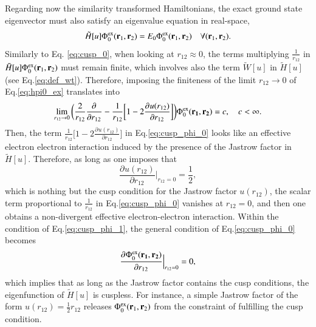 \documentclass[aip,jcp,reprint,noshowkeys,superscriptaddress]{revtex4-1}
\newcommand{\deriv}[3]{\frac{\partial^{#3} #1}{\partial {#2}^{#3}}}
\newcommand{\bd}[1]{{\bf {#1}}}
\newcommand{\br}[0]{{\bf {r}}}
\newcommand{\phiex}[0]{\Phi^{\text{ex}}_0}
\begin{document}
Regarding now the similarity transformed Hamiltonians, the exact ground state eigenvector must also satisfy an eigenvalue equation in real-space,
\begin{equation}
 \label{eq:hpi0_ex}
 \tilde{H}[u] \phiex(\br{}_1,\br{}_2) = E_0 \phiex(\br{}_1,\br{}_2) \quad \forall (\br{}_1,\br{}_2).
\end{equation}
Similarly to Eq. \eqref{eq:cusp_0}, when looking at $r_{12}\approx 0$, the terms multiplying $\frac{1}{r_{12}}$ in $\tilde{H}[u]\phiex(\br{}_1,\br{}_2)$ must remain finite, 
which involves also the term $\tilde{W}[u]$ in $\tilde{H}[u]$ (see Eq.\eqref{eq:def_wt}). Therefore, imposing the finiteness of the limit $r_{12}\rightarrow 0$ of Eq.\eqref{eq:hpi0_ex} translates into
\begin{equation}
 \label{eq:cusp_phi_0}
 \lim_{r_{12}\rightarrow 0}\bigg( \frac{2}{r_{12}} \deriv{}{r_{12}}{} -\frac{1}{r_{12}}\bigg[ 1 - 2 \deriv{u(r_{12})}{r_{12}}{}\bigg]\bigg) \phiex(\bd{r_1},\bd{r_2})  = c,\quad c<\infty.
\end{equation}
Then, the term $\frac{1}{r_{12}}\bigg[ 1 - 2\deriv{u(r_{12})}{r_{12}}{}\bigg]$ in Eq.\eqref{eq:cusp_phi_0} looks like an effective electron electron interaction induced by the presence of the Jastrow factor in $\tilde{H}[u]$. 
Therefore, as long as one imposes that 
\begin{equation}
 \label{eq:cusp_phi_1}
  \deriv{u(r_{12})}{r_{12}}{}\bigg|_{r_{12}=0} = \frac{1}{2},
\end{equation}
which is nothing but the cusp condition for the Jastrow factor $u(r_{12})$, the scalar term proportional to $\frac{1}{r_{12}}$ in Eq.\eqref{eq:cusp_phi_0} vanishes at $r_{12}=0$, and then one obtains a non-divergent effective electron-electron interaction. 
Within the condition of Eq.\eqref{eq:cusp_phi_1}, the general condition of Eq.\eqref{eq:cusp_phi_0} becomes 
\begin{equation}
 \label{eq:cusp_phi_2}
 \deriv{\phiex(\bd{r_1},\bd{r_2})}{r_{12}}{}\Bigr|_{r_{12}=0} = 0, 
\end{equation}
which implies that as long as the Jastrow factor contains the cusp conditions, the eigenfunction of $\tilde{H}[u]$ is cuspless. 
For instance, a simple Jastrow factor of the form $u(r_{12}) = \frac{1}{2} r_{12}$ releases $\phiex(\br{}_1,\br{}_2)$ from 
the constraint of fulfilling the cusp condition. 
\end{document}
